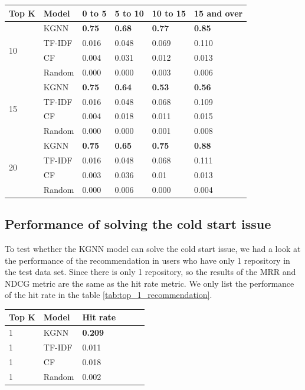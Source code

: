 \documentclass[11pt,twoside]{report}
\begin{document}
\begin{center}
    \begin{tabular}{l | l | l | l | l | l}
    \hline
    Top K & Model & 0 to 5 & 5 to 10 & 10 to 15 & 15 and over \\
    \hline
    \multirow{4}{*}{10} 
    & KGNN & \textbf{0.75} & \textbf{0.68} & \textbf{0.77} & \textbf{0.85} \\
    & TF-IDF & 0.016 & 0.048 & 0.069 & 0.110 \\
    & CF & 0.004 & 0.031 & 0.012 & 0.013 \\
    & Random & 0.000 & 0.000 & 0.003 & 0.006 \\
    \hline
    \multirow{4}{*}{15}
    & KGNN & \textbf{0.75} & \textbf{0.64} & \textbf{0.53} & \textbf{0.56} \\
    & TF-IDF & 0.016 & 0.048 & 0.068 & 0.109 \\
    & CF & 0.004 & 0.018 & 0.011 & 0.015 \\
    & Random & 0.000 & 0.000 & 0.001 & 0.008 \\
    \hline
    \multirow{4}{*}{20}
    & KGNN & \textbf{0.75} & \textbf{0.65} & \textbf{0.75} & \textbf{0.88} \\
    & TF-IDF & 0.016 & 0.048 & 0.068 & 0.111 \\
    & CF & 0.003 & 0.036 & 0.01 & 0.013 \\
    & Random & 0.000 & 0.006 & 0.000 & 0.004 \\
    \end{tabular}
    \label{tab:ndcg_group_performance}
\end{center}

\subsection{Performance of solving the cold start issue}
To test whether the KGNN model can solve the cold start issue, we had a look at the performance of the recommendation in users who have only 1 repository in the test data set. Since there is only 1 repository, so the results of the MRR and NDCG metric are the same as the hit rate metric. We only list the performance of the hit rate in the table \ref{tab:top_1_recommendation}.

\begin{center}
    \begin{tabular}{l | l | l | l | l | l}
    \hline
    Top K & Model & Hit rate \\
    \hline
    1 & KGNN & \textbf{0.209} \\
    1 & TF-IDF & 0.011 \\
    1 & CF & 0.018 \\
    1 & Random & 0.002 \\
    \end{tabular}
    \label{tab:top_1_recommendation}
\end{center}
\end{document}
